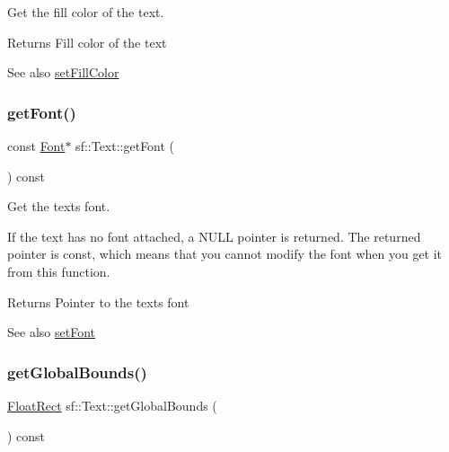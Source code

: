 Get the fill color of the text. 

\begin{DoxyReturn}{Returns}
Fill color of the text
\end{DoxyReturn}
\begin{DoxySeeAlso}{See also}
\hyperlink{classsf_1_1_text_ab7bb3babac5a6da1802b2c3e1a3e6dcc}{set\+Fill\+Color} 
\end{DoxySeeAlso}
\mbox{\label{classsf_1_1_text_a47cd96d7b2c37b2f820e4d6e1bb83f96}} 
\subsubsection{\texorpdfstring{get\+Font()}{getFont()}}
{\footnotesize\ttfamily const \hyperlink{classsf_1_1_font}{Font}$\ast$ sf\+::\+Text\+::get\+Font (\begin{DoxyParamCaption}{ }\end{DoxyParamCaption}) const}



Get the text\textquotesingle{}s font. 

If the text has no font attached, a N\+U\+LL pointer is returned. The returned pointer is const, which means that you cannot modify the font when you get it from this function.

\begin{DoxyReturn}{Returns}
Pointer to the text\textquotesingle{}s font
\end{DoxyReturn}
\begin{DoxySeeAlso}{See also}
\hyperlink{classsf_1_1_text_a2927805d1ae92d57f15034ea34756b81}{set\+Font} 
\end{DoxySeeAlso}
\mbox{\label{classsf_1_1_text_ad33ed96ce9fbe99610f7f8b6874a16b4}} 
\subsubsection{\texorpdfstring{get\+Global\+Bounds()}{getGlobalBounds()}}
{\footnotesize\ttfamily \hyperlink{classsf_1_1_rect}{Float\+Rect} sf\+::\+Text\+::get\+Global\+Bounds (\begin{DoxyParamCaption}{ }\end{DoxyParamCaption}) const}



